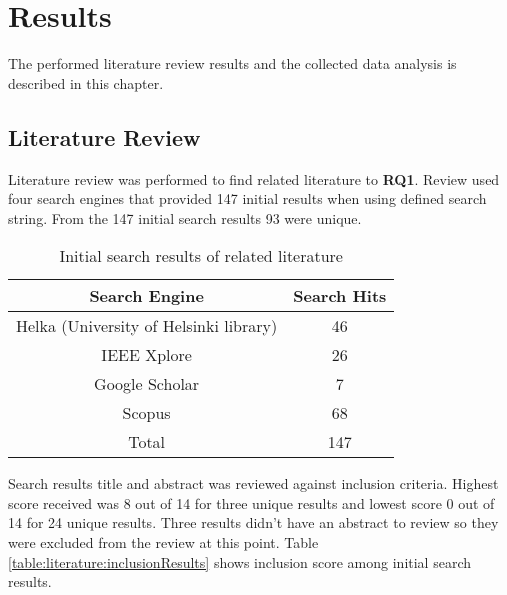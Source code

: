 \chapter{Results\label{results}}
The performed literature review results and the collected data analysis is described in this chapter.

\section{Literature Review}
Literature review was performed to find related literature to \textbf{RQ1}.
Review used four search engines that provided 147 initial results when using defined search string.
From the 147 initial search results 93 were unique.
\begin{table}[ht!]
    \begin{tabular}{|c c|} 
        \hline
        Search Engine
        & Search Hits
        \\ 
        \hline\hline
        Helka (University of Helsinki library)
        & 46
        \\ 
        
        IEEE Xplore
        & 26
        \\ 
        
        Google Scholar
        & 7
        \\ 
        
        Scopus
        & 68
        \\ 
        \hline
        Total
        & 147
        \\ 
        \hline
    \end{tabular}    
    \caption{Initial search results of related literature}
    \label{table:literature:initialSearchResults}
\end{table}
Search results title and abstract was reviewed against inclusion criteria.
Highest score received was 8 out of 14 for three unique results and lowest score 0 out of 14 for 24 unique results.
Three results didn't have an abstract to review so they were excluded from the review at this point.
Table \ref{table:literature:inclusionResults} shows inclusion score among initial search results.
